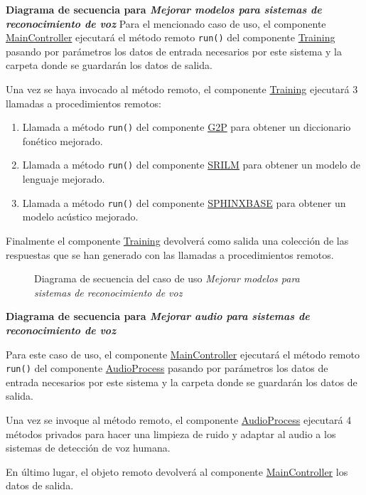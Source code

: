 \documentclass[../main.tex]{subfiles}
\begin{document}
\textbf{Diagrama de secuencia para \textit{Mejorar modelos para sistemas de reconocimiento de voz}}
Para el mencionado caso de uso, el componente \hyperref[par:maincontroller]{MainController} ejecutará el método remoto \verb+run()+ del componente  \hyperref[par:training]{Training} pasando por parámetros los datos de entrada necesarios por este sistema y la carpeta donde se guardarán los datos de salida.

Una vez se haya invocado al método remoto, el componente \hyperref[par:training]{Training} ejecutará 3 llamadas a procedimientos remotos:
\begin{enumerate}
    \item Llamada a método \verb+run()+ del componente \hyperref[par:g2p]{G2P} para obtener un diccionario fonético mejorado.
    \item Llamada a método \verb+run()+ del componente \hyperref[par:srilm]{SRILM} para obtener un modelo de lenguaje mejorado.
    \item Llamada a método \verb+run()+ del componente \hyperref[par:sphinxbase]{SPHINXBASE} para obtener un modelo acústico mejorado.
\end{enumerate}

Finalmente el componente \hyperref[par:training]{Training} devolverá como salida una colección de las respuestas que se han generado con las llamadas a procedimientos remotos.

\begin{figure}[H]
    \centering
    
    \caption{Diagrama de secuencia del caso de uso \textit{Mejorar modelos para sistemas de reconocimiento de voz}}
    \label{fig:flow_training}
\end{figure}

\textbf{Diagrama de secuencia para \textit{Mejorar audio para sistemas de reconocimiento de voz}}

Para este caso de uso, el componente \hyperref[par:maincontroller]{MainController} ejecutará el método remoto \verb+run()+ del componente  \hyperref[par:audioprocess]{AudioProcess} pasando por parámetros los datos de entrada necesarios por este sistema y la carpeta donde se guardarán los datos de salida.

Una vez se invoque al método remoto, el componente \hyperref[par:audioprocess]{AudioProcess} ejecutará 4 métodos privados para hacer una limpieza de ruido y adaptar al audio a los sistemas de detección de voz humana.

En último lugar, el objeto remoto devolverá al componente \hyperref[par:maincontroller]{MainController} los datos de salida.
\end{document}
